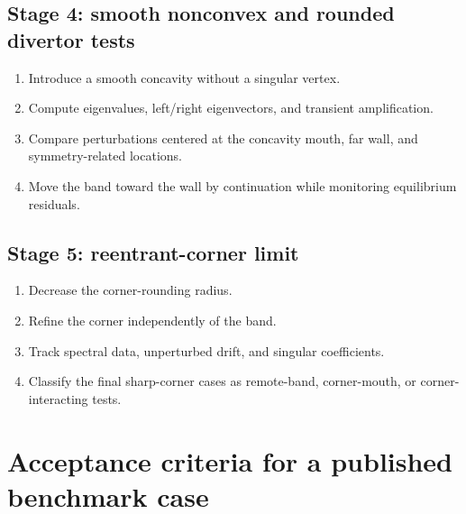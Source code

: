 \documentclass[11pt,a4paper]{article}
\begin{document}
\subsection*{Stage 4: smooth nonconvex and rounded divertor tests}
\begin{enumerate}
  \item Introduce a smooth concavity without a singular vertex.
  \item Compute eigenvalues, left/right eigenvectors, and transient amplification.
  \item Compare perturbations centered at the concavity mouth, far wall, and symmetry-related locations.
  \item Move the band toward the wall by continuation while monitoring equilibrium residuals.
\end{enumerate}

\subsection*{Stage 5: reentrant-corner limit}
\begin{enumerate}
  \item Decrease the corner-rounding radius.
  \item Refine the corner independently of the band.
  \item Track spectral data, unperturbed drift, and singular coefficients.
  \item Classify the final sharp-corner cases as remote-band, corner-mouth, or corner-interacting tests.
\end{enumerate}

\section{Acceptance criteria for a published benchmark case}
\end{document}
